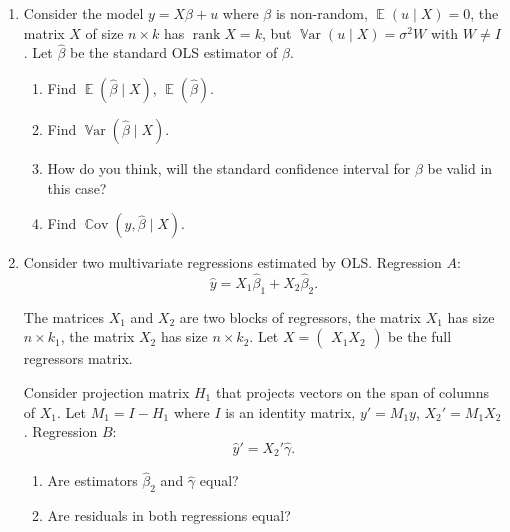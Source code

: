 \documentclass[12pt]{article}
\DeclareMathOperator{\rank}{rank}
\DeclareMathOperator{\Cov}{\mathbb{C}ov}
\DeclareMathOperator{\Var}{\mathbb{V}ar}
\DeclareMathOperator{\E}{\mathbb{E}}
\newcommand{\hb}{\hat\beta}
\begin{document}
\begin{enumerate}
    \item Consider the model $y = X\beta + u$ where $\beta$ is non-random,
    $\E(u \mid X ) = 0$, the matrix $X$ of size $n\times k$ has $\rank X = k$, 
    but $\Var(u \mid X) = \sigma^2 W$ with $W \neq I$.
    Let $\hb$ be the standard OLS estimator of $\beta$.

    \begin{enumerate}
        \item Find $\E(\hb \mid X)$, $\E(\hb)$.
        \item Find $\Var(\hb \mid X)$.
        \item How do you think, will the standard confidence interval for $\beta$ be valid in this case?
        \item Find $\Cov(y, \hb \mid X)$.
    \end{enumerate}

    \item Consider two multivariate regressions estimated by OLS.
    Regression $A$: 
    \[
    \hat y = X_1 \hb_1 + X_2 \hb_2.
    \]
    
    The matrices $X_1$ and $X_2$ are two blocks of regressors, 
    the matrix $X_1$ has size $n\times k_1$, 
    the matrix $X_2$ has size $n\times k_2$.
    Let $X = \begin{pmatrix}
        X_1 X_2
    \end{pmatrix}$ be the full regressors matrix. 

    Consider projection matrix $H_1$ that projects vectors on the span of columns of $X_1$.
    Let $M_1 = I - H_1$ where $I$ is an identity matrix, $y' = M_1 y$, $X_2' = M_1 X_2$.
    Regression $B$:
    \[
    \hat y' = X_2' \hat{\gamma}.
    \]

    \begin{enumerate}
        \item Are estimators $\hb_2$ and $\hat \gamma$ equal?
        \item Are residuals in both regressions equal?
    \end{enumerate}

\end{enumerate}
\end{document}
